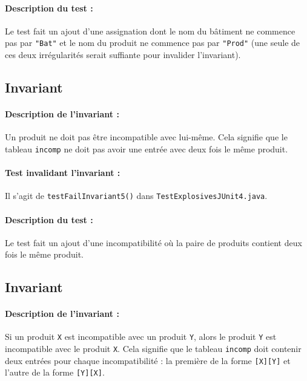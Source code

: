 \documentclass{article}
\begin{document}
\vspace{-0.2cm}
\paragraph{Description du test :} Le test fait un ajout d'une assignation dont le nom du bâtiment ne commence pas par \texttt{"Bat"} et le nom du produit ne commence pas par \texttt{"Prod"} (une seule de ces deux irrégularités serait suffiante pour invalider l'invariant).

\subsection{Invariant }

\paragraph{Description de l'invariant :} Un produit ne doit pas être incompatible avec lui-même. Cela signifie que le tableau \texttt{incomp} ne doit pas avoir une entrée avec deux fois le même produit.

\vspace{-0.2cm}
\paragraph{Test invalidant l'invariant :} Il s'agit de \texttt{testFailInvariant5()} dans \texttt{TestExplosivesJUnit4.java}.

\vspace{-0.2cm}
\paragraph{Description du test :} Le test fait un ajout d'une incompatibilité où la paire de produits contient deux fois le même produit.

\subsection{Invariant }

\paragraph{Description de l'invariant :} Si un produit \texttt{X} est incompatible avec un produit \texttt{Y}, alors le produit \texttt{Y} est incompatible avec le produit \texttt{X}. Cela signifie que le tableau \texttt{incomp} doit contenir deux entrées pour chaque incompatibilité : la première de la forme \texttt{[X][Y]} et l'autre de la forme \texttt{[Y][X]}.
\end{document}
